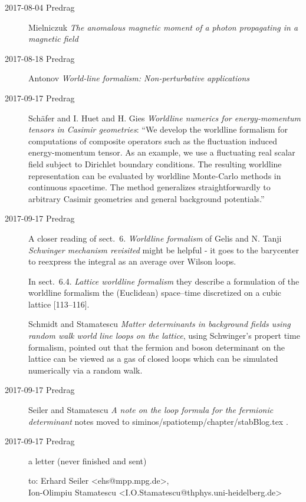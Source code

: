 \begin{description}
\item[2017-08-04 Predrag]
Mielniczuk \etal{}
{\em The anomalous magnetic moment of a photon propagating in a magnetic field}

\item[2017-08-18 Predrag]
Antonov
{\em World-line formalism: {Non-perturbative} applications}

\item[2017-09-17 Predrag]
Sch{\"a}fer and I. Huet and H. Gies
{\em Worldline numerics for energy-momentum tensors in {Casimir} geometries}:
``We develop the worldline formalism for computations of composite operators
such as the fluctuation induced energy-momentum tensor. As an example, we use
a fluctuating real scalar field subject to Dirichlet boundary conditions. The
resulting worldline representation can be evaluated by worldline Monte-Carlo
methods in continuous spacetime. The method generalizes straightforwardly
to arbitrary Casimir geometries and general background potentials.''


\item[2017-09-17 Predrag]
A closer reading of sect.~6. {\em Worldline formalism} of Gelis and N.
Tanji {\em Schwinger mechanism revisited} might be helpful - it
goes to the barycenter to reexpress the integral as an average over Wilson
loops.

In sect.~6.4. {\em Lattice worldline formalism} they describe a
formulation of the worldline formalism the (Euclidean) space–time
discretized on a cubic lattice  [113–116].

Schmidt and Stamatescu {\em Matter determinants in
background fields using random walk world line loops on the lattice},
using Schwinger's propert time formalism, pointed out that the fermion and
boson determinant on the lattice can be viewed as a gas of closed loops
which can be simulated numerically via a random walk.

\item[2017-09-17 Predrag]
Seiler and Stamatescu
{\em A note on the loop formula for the fermionic determinant}
notes moved to 
siminos/spatiotemp/chapter/stabBlog.tex .

\item[2017-09-17 Predrag]
a letter (never finished and sent)

to: Erhard Seiler <ehs@mpp.mpg.de>,\\
Ion-Olimpiu Stamatescu <I.O.Stamatescu@thphys.uni-heidelberg.de>


\end{description}
